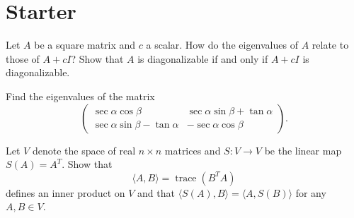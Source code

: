 \documentclass[answers]{exam}
\begin{document}
\section*{Starter}
\begin{questions}

\question%
Let $A$ be a square matrix and $c$ a scalar. How do the eigenvalues of $A$ relate to those of $A+c I$? Show that $A$ is diagonalizable if and only if $A+c I$ is diagonalizable.



\question%
Find the eigenvalues of the matrix \[
	\begin{pmatrix}
		\sec \alpha \cos \beta & \sec \alpha \sin \beta+\tan \alpha \\
		\sec \alpha \sin \beta-\tan \alpha & -\sec \alpha \cos \beta
	\end{pmatrix}.
\]



\question%
Let $V$ denote the space of real $n \times n$ matrices and $S: V \to V$ be the linear map $S(A)=A^{T}$. Show that \[
	\langle A, B\rangle=\operatorname{trace}(B^{T} A)
\] defines an inner product on $V$ and that $\langle S(A), B\rangle=\langle A, S(B)\rangle$ for any $A, B \in V$.

\end{questions}
\end{document}

